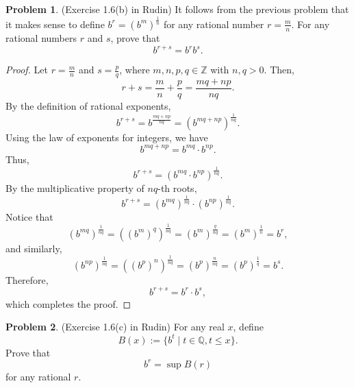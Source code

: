 \documentclass[12pt,oneside]{article}
\theoremstyle{definition}
\newtheorem{problem}{Problem}
\begin{document}
\newpage
\begin{problem}
(Exercise 1.6(b) in Rudin)
It follows from the previous problem that it makes sense to define $b^r = (b^m)^{\frac{1}{n}}$ for any rational number $r = \frac{m}{n}$. 
For any rational numbers $r$ and $s$, prove that 
\[
b^{r+s} = b^{r}b^{s}.
\]
\end{problem}


\begin{proof}
    Let \( r = \frac{m}{n} \) and \( s = \frac{p}{q} \), where \( m, n, p, q \in \mathbb{Z} \) with \( n, q > 0 \). Then,
    \[
    r+s = \frac{m}{n} + \frac{p}{q} = \frac{mq + np}{nq}.
    \]
    By the definition of rational exponents,
    \[
    b^{r+s} = b^{\frac{mq+np}{nq}} = \left( b^{mq+np} \right)^{\frac{1}{nq}}.
    \]
    Using the law of exponents for integers, we have
    \[
    b^{mq+np} = b^{mq} \cdot b^{np}.
    \]
    Thus,
    \[
    b^{r+s} = \left( b^{mq} \cdot b^{np} \right)^{\frac{1}{nq}}.
    \]
    By the multiplicative property of \(nq\)-th roots,
    \[
    b^{r+s} = \left( b^{mq} \right)^{\frac{1}{nq}} \cdot \left( b^{np} \right)^{\frac{1}{nq}}.
    \]
    Notice that
    \[
    \left( b^{mq} \right)^{\frac{1}{nq}} = \left( \left(b^m\right)^q \right)^{\frac{1}{nq}} = \left( b^m \right)^{\frac{q}{nq}} = \left( b^m \right)^{\frac{1}{n}} = b^r,
    \]
    and similarly,
    \[
    \left( b^{np} \right)^{\frac{1}{nq}} = \left( \left(b^p\right)^n \right)^{\frac{1}{nq}} = \left( b^p \right)^{\frac{n}{nq}} = \left( b^p \right)^{\frac{1}{q}} = b^s.
    \]
    Therefore,
    \[
    b^{r+s} = b^r \cdot b^s,
    \]
    which completes the proof.
    \end{proof}













\newpage
\begin{problem}
(Exercise 1.6(c) in Rudin)
For any real $x$, define
\[
B(x) := \{b^t \;\vert\; t\in \mathbb{Q}, t \leq x\}.
\]
Prove that
\[
b^r = \sup B(r)
\]
for any rational $r$. 
\end{problem}
\end{document}
